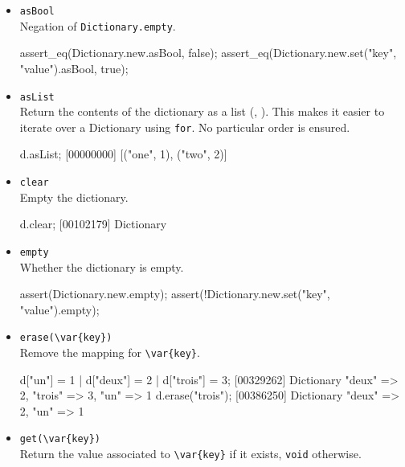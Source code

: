 \begin{itemize}
\item \lstinline|asBool|\\
  Negation of \lstinline|Dictionary.empty|.
\begin{urbiscript}[firstnumber=last]
assert_eq(Dictionary.new.asBool, false);
assert_eq(Dictionary.new.set("key", "value").asBool, true);
\end{urbiscript}

\item \lstinline|asList|\\
  Return the contents of the dictionary as a  list
  (, ).  This makes it easier to iterate over a
  Dictionary using \lstinline|for|.  No particular order is ensured.

\begin{urbiscript}[firstnumber=last]
d.asList;
[00000000] [("one", 1), ("two", 2)]
\end{urbiscript}

\item \lstinline|clear|\\
  Empty the dictionary.

\begin{urbiscript}[firstnumber=last]
d.clear;
[00102179] Dictionary {}
\end{urbiscript}

\item \lstinline|empty|\\
  Whether the dictionary is empty.

\begin{urbiscript}[firstnumber=last]
assert(Dictionary.new.empty);
assert(!Dictionary.new.set("key", "value").empty);
\end{urbiscript}

\item \lstinline|erase(\var{key})|\\
  Remove the mapping for \lstinline|\var{key}|.

\begin{urbiscript}[firstnumber=last]
d["un"] = 1 | d["deux"] = 2 | d["trois"] = 3;
[00329262] Dictionary {"deux" => 2, "trois" => 3, "un" => 1}
d.erase("trois");
[00386250] Dictionary {"deux" => 2, "un" => 1}
\end{urbiscript}

\item \lstinline|get(\var{key})|\\
  Return the value associated to  \lstinline|\var{key}| if it exists,
  \lstinline|void| otherwise.


\end{itemize}
